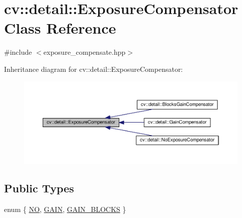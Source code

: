 \hypertarget{classcv_1_1detail_1_1ExposureCompensator}{\section{cv\-:\-:detail\-:\-:Exposure\-Compensator Class Reference}
\label{classcv_1_1detail_1_1ExposureCompensator}
}


{\ttfamily \#include $<$exposure\-\_\-compensate.\-hpp$>$}



Inheritance diagram for cv\-:\-:detail\-:\-:Exposure\-Compensator\-:\nopagebreak
\begin{figure}[H]
\begin{center}
\leavevmode
\includegraphics[width=350pt]{classcv_1_1detail_1_1ExposureCompensator__inherit__graph}
\end{center}
\end{figure}
\subsection*{Public Types}
\begin{DoxyCompactItemize}
\item 
enum \{ \hyperlink{classcv_1_1detail_1_1ExposureCompensator_a8a711cd1e1a57eacf386476bcd0edacda6903ebd9f5e55a2f484a789fce68bf48}{N\-O}, 
\hyperlink{classcv_1_1detail_1_1ExposureCompensator_a8a711cd1e1a57eacf386476bcd0edacda6ba7b5295c631d353f070e1e471d8cee}{G\-A\-I\-N}, 
\hyperlink{classcv_1_1detail_1_1ExposureCompensator_a8a711cd1e1a57eacf386476bcd0edacdac165e2abfe45df8b7216509597a833e8}{G\-A\-I\-N\-\_\-\-B\-L\-O\-C\-K\-S}
 \}
\end{DoxyCompactItemize}
